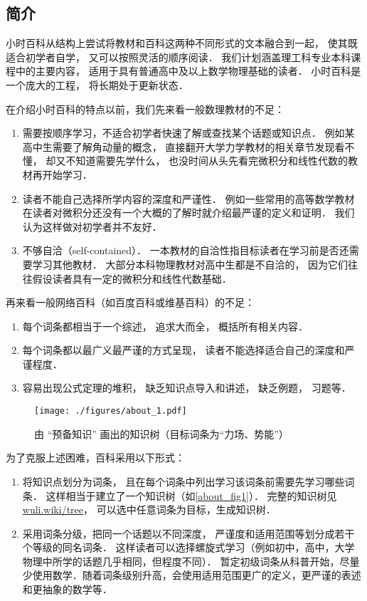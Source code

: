 \subsection{简介}

小时百科从结构上尝试将教材和百科这两种不同形式的文本融合到一起， 使其既适合初学者自学， 又可以按照灵活的顺序阅读． 我们计划涵盖理工科专业本科课程中的主要内容， 适用于具有普通高中及以上数学物理基础的读者． 小时百科是一个庞大的工程， 将长期处于更新状态．

在介绍小时百科的特点以前，我们先来看一般数理教材的不足：
\begin{enumerate}
\item 需要按顺序学习，不适合初学者快速了解或查找某个话题或知识点． 例如某高中生需要了解角动量的概念， 直接翻开大学力学教材的相关章节发现看不懂， 却又不知道需要先学什么， 也没时间从头先看完微积分和线性代数的教材再开始学习．
\item 读者不能自己选择所学内容的深度和严谨性． 例如一些常用的高等数学教材在读者对微积分还没有一个大概的了解时就介绍最严谨的定义和证明． 我们认为这样做对初学者并不友好．
\item 不够自洽（self-contained）． 一本教材的自洽性指目标读者在学习前是否还需要学习其他教材． 大部分本科物理教材对高中生都是不自洽的， 因为它们往往假设读者具有一定的微积分和线性代数基础．
\end{enumerate}

再来看一般网络百科（如百度百科或维基百科）的不足：
\begin{enumerate}
\item 每个词条都相当于一个综述， 追求大而全， 概括所有相关内容．
\item 每个词条都以最广义最严谨的方式呈现， 读者不能选择适合自己的深度和严谨程度．
\item 容易出现公式定理的堆积， 缺乏知识点导入和讲述， 缺乏例题， 习题等．
\end{enumerate}

\begin{figure}[ht]
\centering
\texttt{[image: ./figures/about\_1.pdf]}
\caption{由 “预备知识” 画出的知识树（目标词条为“力场、势能”）}\label{about_fig1}
\end{figure}

为了克服上述困难，百科采用以下形式：
\begin{enumerate}
\item 将知识点划分为词条， 且在每个词条中列出学习该词条前需要先学习哪些词条． 这样相当于建立了一个知识树（如\autoref{about_fig1}）． 完整的知识树见 \href{https://wuli.wiki/tree}{wuli.wiki/tree}， 可以选中任意词条为目标，生成知识树．
\item 采用词条分级，把同一个话题以不同深度， 严谨度和适用范围等划分成若干个等级的同名词条． 这样读者可以选择螺旋式学习（例如初中，高中，大学物理中所学的话题几乎相同，但程度不同）． 暂定初级词条从科普开始，尽量少使用数学．随着词条级别升高，会使用适用范围更广的定义，更严谨的表述和更抽象的数学等．
\end{enumerate}

